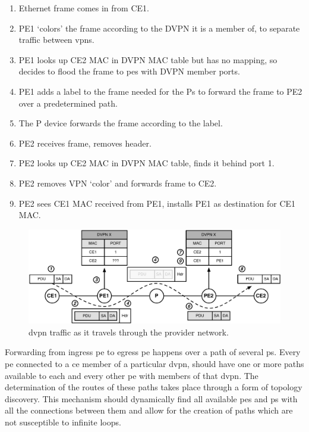 \begin{enumerate}
	\item Ethernet frame comes in from CE1.
	\item PE1 `colors' the frame according to the DVPN it is a member of, to separate traffic between \acp{vpn}.
	\item PE1 looks up CE2 MAC in DVPN MAC table but has no mapping, so decides to flood the frame to \acp{pe} with DVPN member ports.
	\item PE1 adds a label to the frame needed for the Ps to forward the frame to PE2 over a predetermined path.
	\item The P device forwards the frame according to the label.
	\item PE2 receives frame, removes header.
	\item PE2 looks up CE2 MAC in DVPN MAC table, finds it behind port 1.
	\item PE2 removes VPN `color' and forwards frame to CE2.
	\item PE2 sees CE1 MAC received from PE1, installs PE1 as destination for CE1 MAC.
\end{enumerate}

\begin{figure}[!h]
	\centering
	\includegraphics[width=14cm]{./includes/vpn-traffic.pdf}
	\caption{\ac{dvpn} traffic as it travels through the provider network.}
	\label{fig:vpn-traffic}
\end{figure}

Forwarding from ingress \ac{pe} to egress \ac{pe} happens over a path of several \acp{p}. Every \ac{pe} connected to a \ac{ce} member of a particular \ac{dvpn}, should have one or more paths available to each and every other \ac{pe} with members of that \ac{dvpn}. The determination of the routes of these paths takes place through a form of topology discovery. This mechanism should dynamically find all available \acp{pe} and \acp{p} with all the connections between them and allow for the creation of paths which are not susceptible to infinite loops.

